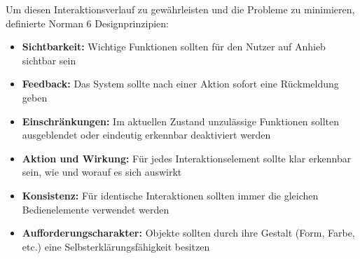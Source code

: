 Um diesen Interaktionsverlauf zu gewährleisten und die Probleme zu minimieren, definierte Norman 6 Designprinzipien:
\begin{itemize}
	\item \textbf{Sichtbarkeit:} Wichtige Funktionen sollten für den Nutzer auf Anhieb sichtbar sein
	\item \textbf{Feedback:} Das System sollte nach einer Aktion sofort eine Rückmeldung geben
	\item \textbf{Einschränkungen:} Im aktuellen Zustand unzulässige Funktionen sollten ausgeblendet oder eindeutig erkennbar deaktiviert werden
	\item \textbf{Aktion und Wirkung:} Für jedes Interaktionselement sollte klar erkennbar sein, wie und worauf es sich auswirkt
	\item \textbf{Konsistenz:} Für identische Interaktionen sollten immer die gleichen Bedienelemente verwendet werden
	\item \textbf{Aufforderungscharakter:} Objekte sollten durch ihre Gestalt (Form, Farbe, etc.) eine Selbsterklärungsfähigkeit besitzen \cite[S. 125]{Moser2012}
\end{itemize}
\newpage
